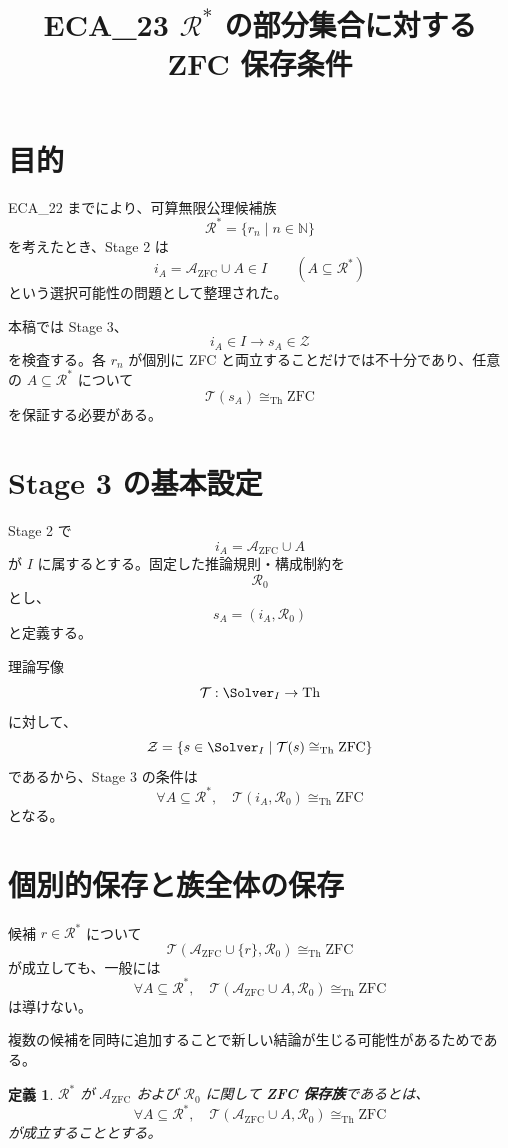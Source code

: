 \documentclass[a4paper,11pt]{ltjsarticle}
\title{ECA_23 \(\mathcal{R}^*\) の部分集合に対する ZFC 保存条件}
\author{}
\date{}
\newtheorem{definition}{定義}
\begin{document}
\maketitle

\section{目的}
ECA_22 までにより、可算無限公理候補族
\[
\mathcal{R}^*=\{r_n\mid n\in\mathbb N\}
\]
を考えたとき、Stage 2 は
\[
i_A=\mathcal{A}_{\mathrm{ZFC}}\cup A\in I
\qquad(A\subseteq\mathcal{R}^*)
\]
という選択可能性の問題として整理された。

本稿では Stage 3、
\[
i_A\in I\longrightarrow s_A\in\mathcal{Z}
\]
を検査する。各 \(r_n\) が個別に ZFC と両立することだけでは不十分であり、任意の \(A\subseteq\mathcal{R}^*\) について
\[
\mathcal{T}(s_A)\cong_{\mathrm{Th}}\mathrm{ZFC}
\]
を保証する必要がある。

\section{Stage 3 の基本設定}
Stage 2 で
\[
i_A=\mathcal{A}_{\mathrm{ZFC}}\cup A
\]
が \(I\) に属するとする。固定した推論規則・構成制約を
\[
\mathcal{R}_0
\]
とし、
\[
s_A=(i_A,\mathcal{R}_0)
\]
と定義する。

理論写像
\[
\mathcal{T}:\Solver_I\to\mathrm{Th}
\]
に対して、
\[
\mathcal{Z}=
\left\{
s\in\Solver_I\mid
\mathcal{T}(s)\cong_{\mathrm{Th}}\mathrm{ZFC}
\right\}
\]
であるから、Stage 3 の条件は
\[
\boxed{
\forall A\subseteq\mathcal{R}^*,
\quad
\mathcal{T}(i_A,\mathcal{R}_0)
\cong_{\mathrm{Th}}\mathrm{ZFC}
}
\]
となる。

\section{個別的保存と族全体の保存}
候補 \(r\in\mathcal{R}^*\) について
\[
\mathcal{T}(\mathcal{A}_{\mathrm{ZFC}}\cup\{r\},\mathcal{R}_0)
\cong_{\mathrm{Th}}\mathrm{ZFC}
\]
が成立しても、一般には
\[
\forall A\subseteq\mathcal{R}^*,
\quad
\mathcal{T}(\mathcal{A}_{\mathrm{ZFC}}\cup A,\mathcal{R}_0)
\cong_{\mathrm{Th}}\mathrm{ZFC}
\]
は導けない。

複数の候補を同時に追加することで新しい結論が生じる可能性があるためである。

\begin{definition}
\(\mathcal{R}^*\) が \(\mathcal{A}_{\mathrm{ZFC}}\) および \(\mathcal{R}_0\) に関して \textbf{ZFC 保存族}であるとは、
\[
\boxed{
\forall A\subseteq\mathcal{R}^*,
\quad
\mathcal{T}(\mathcal{A}_{\mathrm{ZFC}}\cup A,\mathcal{R}_0)
\cong_{\mathrm{Th}}\mathrm{ZFC}
}
\]
が成立することとする。
\end{definition}
\end{document}
